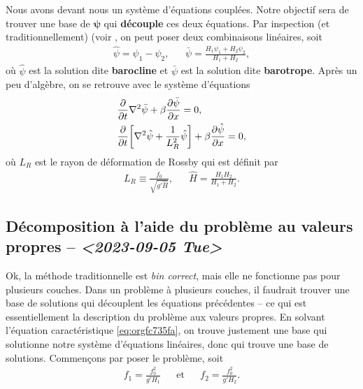 \documentclass[10pt]{report}
\numberwithin{equation}{section}
\begin{document}
Nous avons devant nous un système d'équations couplées.
Notre objectif sera de trouver une base de \(\boldsymbol{\psi}\) qui \textbf{découple} ces deux équations.
Par inspection (et traditionnellement) (voir \autocite[p.230]{vallis_2006}, on peut poser deux combinaisons linéaires, soit
\begin{align}
   &&\hat{\psi} = \psi_1 - \psi_2 ,&& \bar{\psi} = \frac{H_1\psi_1 + H_2\psi_2}{H_1+H_2}, &&
\end{align}
où \(\hat{\psi}\) est la solution dite \textbf{barocline} et \(\bar{\psi}\) est la solution dite \textbf{barotrope}.
Après un peu d'algèbre, on se retrouve avec le système d'équations
\begin{subequations}
\begin{align}
   &\pdv{}{t} \laplacian\bar{\psi} + \beta \pdv{\bar{\psi}}{x} = 0,\\
   &\pdv{}{t} \qty[\laplacian\hat{\psi} + \frac{1}{L_R^2}\hat{\psi}] + \beta \pdv{\hat{\psi}}{x} = 0,
\end{align}
\end{subequations}
où \(L_R\) est le rayon de déformation de Rossby qui est définit par
\begin{align}
   && L_R \equiv \frac{f_0}{\sqrt{g'\hat{H}}}, && \hat{H} = \frac{H_1H_2}{H_1+H_2}.&&
\end{align}

\subsection{Décomposition à l'aide du problème au valeurs propres -- \textit{<2023-09-05 Tue>}}
\label{sec:org6cab686}

Ok, la méthode traditionnelle est \emph{bin correct}, mais elle ne fonctionne pas pour plusieurs couches.
Dans un problème à plusieurs couches, il faudrait trouver une base de solutions qui découplent les équations précédentes -- ce qui est essentiellement la description du problème aux valeurs propres.
En solvant l'équation caractéristique \ref{eq:orgfc735fa}, on trouve justement une base qui solutionne notre système d'équations linéaires, donc qui trouve une base de solutions.
Commençons par poser le problème, soit
\begin{align}
   && f_1 = \frac{f_0^2}{g'H_1} && \text{et} && f_2 = \frac{f_0^2}{g'H_2}. &&
\end{align}
\end{document}
